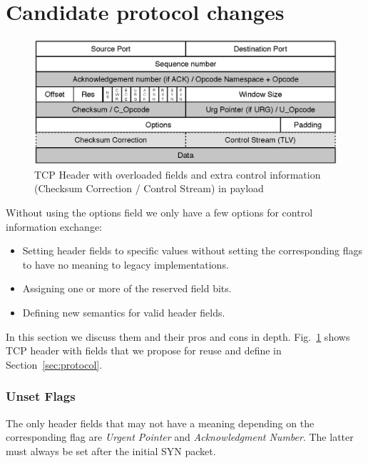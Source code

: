 \documentclass{sig-alternate-10pt}
\begin{document}
\section{Candidate protocol changes}
\label{sec:protocolChanges}

\begin{figure}[t!]
\centering
\small{
\includegraphics[width=\columnwidth]{figs/tcp-header}
\vspace{-3mm}
\caption{TCP Header with overloaded fields and extra control information (Checksum Correction / Control Stream) in payload}
\label{fig:header}
}
\vspace{-2mm}
\end{figure}

Without using the options field we only have a few options for control information exchange:
\begin{itemize}
    \item Setting header fields to specific values without setting the corresponding flags to have no meaning to legacy implementations.
    \item Assigning one or more of the reserved field bits.
    \item Defining new semantics for valid header fields.
\end{itemize}

In this section we discuss them and their pros and cons in depth. Fig.~\ref{fig:header} shows TCP header with fields that we propose for reuse and define in Section~\ref{sec:protocol}.

\subsubsection*{Unset Flags}
\label{sec:unset}

The only header fields that may not have a meaning depending on the corresponding flag are \emph{Urgent Pointer} and \emph{Acknowledgment Number}. The latter must always be set after the initial SYN packet.
\end{document}
